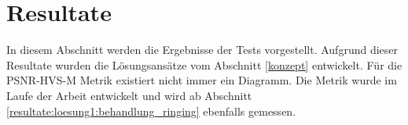 \section{Resultate}\label{resultate}
In diesem Abschnitt werden die Ergebnisse der Tests vorgestellt. Aufgrund dieser Resultate wurden die Lösungsansätze vom Abschnitt \ref{konzept} entwickelt. Für die PSNR-HVS-M Metrik existiert nicht immer ein Diagramm. Die Metrik wurde im Laufe der Arbeit entwickelt und wird ab Abschnitt \ref{resultate:loesung1:behandlung_ringing} ebenfalls gemessen.


\pagebreak

\pagebreak
